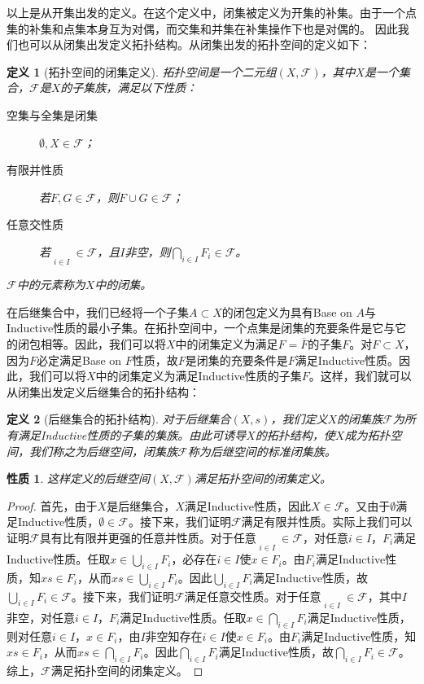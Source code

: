 \documentclass[oneside, 12pt]{ctexart}
\newtheorem{definition}{定义}[section]
\newtheorem{property}{性质}[section]
\begin{document}
以上是从开集出发的定义。在这个定义中，闭集被定义为开集的补集。由于一个点集的补集和点集本身互为对偶，而交集和并集在补集操作下也是对偶的。%
因此我们也可以从闭集出发定义拓扑结构。从闭集出发的拓扑空间的定义如下：

\begin{definition}[拓扑空间的闭集定义]
	拓扑空间是一个二元组$(X, \mathcal{F})$，其中$X$是一个集合，$\mathcal{F}$是$X$的子集族，满足以下性质：
	\begin{description}
		\item[空集与全集是闭集] $\emptyset, X \in \mathcal{F}$；
		\item[有限并性质] 若$F, G \in \mathcal{F}$，则$F \cup G \in \mathcal{F}$；
		\item[任意交性质] 若$\mathop{F_i}\limits_{i \in I} \in \mathcal{F}$，且$I$非空，则$\bigcap\limits_{i \in I} F_i \in \mathcal{F}$。
	\end{description}
	$\mathcal{F}$中的元素称为$X$中的闭集。
\end{definition}

在后继集合中，我们已经将一个子集$A \subset X$的闭包定义为具有Base on $A$与Inductive性质的最小子集。在拓扑空间中，一个点集是闭集的充要条件是它与它的闭包相等。因此，我们可以将$X$中的闭集定义为满足$F = \overline{F}$的子集$F$。对$F \subset X$，因为$F$必定满足Base on $F$性质，故$F$是闭集的充要条件是$F$满足Inductive性质。因此，我们可以将$X$中的闭集定义为满足Inductive性质的子集$F$。这样，我们就可以从闭集出发定义后继集合的拓扑结构：

\begin{definition}[后继集合的拓扑结构]
	对于后继集合$(X, s)$，我们定义$X$的闭集族$\mathcal{F}$为所有满足Inductive性质的子集的集族。由此可诱导$X$的拓扑结构，使$X$成为拓扑空间，我们称之为后继空间，闭集族$\mathcal{F}$称为后继空间的标准闭集族。
\end{definition}

\begin{property}
	这样定义的后继空间$(X, \mathcal{F})$满足拓扑空间的闭集定义。
\end{property}

\begin{proof}
	首先，由于$X$是后继集合，$X$满足Inductive性质，因此$X \in \mathcal{F}$。又由于$\emptyset$满足Inductive性质，$\emptyset \in \mathcal{F}$。接下来，我们证明$\mathcal{F}$满足有限并性质。实际上我们可以证明$\mathcal{F}$具有比有限并更强的任意并性质。对于任意$\mathop{F_i}\limits_{i \in I} \in \mathcal{F}$，对任意$i \in I$，$F_i$满足Inductive性质。任取$x \in \bigcup_{i \in I} F_i$，必存在$i \in I$使$x \in F_i$。由$F_i$满足Inductive性质，知$xs \in F_i$，从而$xs \in \bigcup_{i \in I} F_i$。因此$\bigcup_{i \in I} F_i$满足Inductive性质，故$\bigcup_{i \in I} F_i \in \mathcal{F}$。接下来，我们证明$\mathcal{F}$满足任意交性质。对于任意$\mathop{F_i}\limits_{i \in I} \in \mathcal{F}$，其中$I$非空，对任意$i \in I$，$F_i$满足Inductive性质。任取$x \in \bigcap_{i \in I} F_i$满足Inductive性质，则对任意$i \in I$，$x \in F_i$，由$I$非空知存在$i \in I$使$x \in F_i$。由$F_i$满足Inductive性质，知$xs \in F_i$，从而$xs \in \bigcap_{i \in I} F_i$。因此$\bigcap_{i \in I} F_i$满足Inductive性质，故$\bigcap_{i \in I} F_i \in \mathcal{F}$。综上，$\mathcal{F}$满足拓扑空间的闭集定义。
\end{proof}
\end{document}

